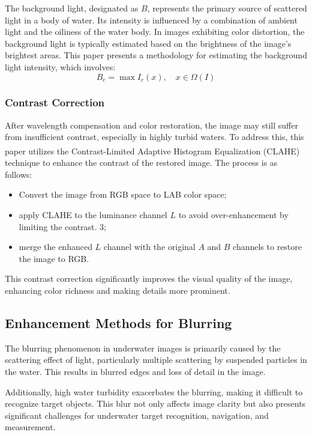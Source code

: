 \documentclass[withoutpreface,bwprint]{cumcmthesis}
\begin{document}
The background light, designated as $B$, represents the primary source of scattered light in a body of water. Its intensity is influenced by a combination of ambient light and the oiliness of the water body. In images exhibiting color distortion, the background light is typically estimated based on the brightness of the image's brightest areas. This paper presents a methodology for estimating the background light intensity, which involves:
\[B_c = \max I_c(x), \quad x \in \Omega(I)\]

\subsubsection{Contrast Correction}

After wavelength compensation and color restoration, the image may still suffer from insufficient contrast, especially in highly turbid waters. To address this, this paper utilizes the Contrast-Limited Adaptive Histogram Equalization (CLAHE)\textsuperscript{\cite{reza2004realization}} technique to enhance the contrast of the restored image. The process is as follows:

\begin{itemize}
    \item Convert the image from RGB space to LAB color space;

    \item apply CLAHE to the luminance channel $L$ to avoid over-enhancement by limiting the contrast. 3;

    \item merge the enhanced $L$ channel with the original $A$ and $B$ channels to restore the image to RGB.
\end{itemize}

This contrast correction significantly improves the visual quality of the image, enhancing color richness and making details more prominent.

\subsection{Enhancement Methods for Blurring}

The blurring phenomenon in underwater images is primarily caused by the scattering effect of light, particularly multiple scattering by suspended particles in the water. This results in blurred edges and loss of detail in the image. 

Additionally, high water turbidity exacerbates the blurring, making it difficult to recognize target objects. This blur not only affects image clarity but also presents significant challenges for underwater target recognition, navigation, and measurement.
\end{document}
